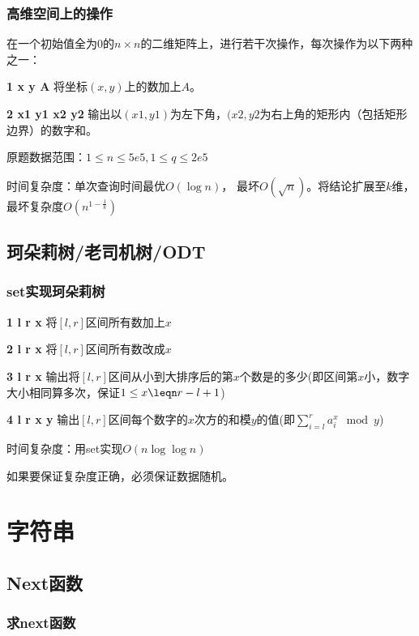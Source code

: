 \documentclass{article}
\begin{document}
\subsubsection{高维空间上的操作}
在一个初始值全为$0$的$n\times n$的二维矩阵上，进行若干次操作，每次操作为以下两种之一：\par
\textbf{1 x y A} 将坐标$(x,y)$上的数加上$A$。\par
\textbf{2 x1 y1 x2 y2} 输出以$(x1, y1)$为左下角，$(x2, y2$为右上角的矩形内（包括矩形边界）的数字和。\par
原题数据范围：$1\leq n \leq 5e5, 1\leq q \leq 2e5$\par
时间复杂度：单次查询时间最优$O(\log{n})$， 最坏$O(\sqrt{n})$。将结论扩展至$k$维，最坏复杂度$O(n^{1-\frac{1}{k}})$



\subsection{珂朵莉树/老司机树/ODT}
\subsubsection{set实现珂朵莉树}
\textbf{1 l r x} 将$[l,r]$区间所有数加上$x$\par
\textbf{2 l r x} 将$[l,r]$区间所有数改成$x$\par
\textbf{3 l r x} 输出将$[l,r]$区间从小到大排序后的第$x$个数是的多少(即区间第$x$小，数字大小相同算多次，保证$1\leq x \leqn r-l+1$)\par
\textbf{4 l r x y} 输出$[l,r]$区间每个数字的$x$次方的和模$y$的值(即$\sum^r_{i=l}a_i^x \mod y $)\par
时间复杂度：用set实现$O(n\log \log {n})$\par
如果要保证复杂度正确，必须保证数据随机。\par

\section{字符串}


\subsection{Next函数}
\subsubsection{求next函数}

\end{document}
